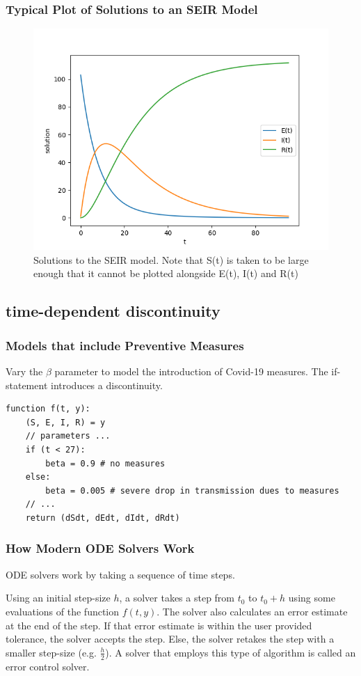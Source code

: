 \documentclass{beamer}
\begin{document}
\begin{frame}
\frametitle{Typical Plot of Solutions to an SEIR Model}
\begin{figure}[H]
\centering
\includegraphics[width=0.7\linewidth]{./figures/SEIR}
\caption{Solutions to the SEIR model. Note that S(t) is taken to be large enough that it cannot be plotted alongside E(t), I(t) and R(t)}
\label{fig:SEIR}
\end{figure}
\end{frame}

\subsection{time-dependent discontinuity}
\begin{frame}[fragile]
\frametitle{Models that include Preventive Measures}
Vary the $\beta$ parameter to model the introduction of Covid-19 measures.
The if-statement introduces a discontinuity.
\begin{lstlisting}
function f(t, y):
    (S, E, I, R) = y
    // parameters ...
    if (t < 27): 
        beta = 0.9 # no measures
    else: 
        beta = 0.005 # severe drop in transmission dues to measures
    // ...
    return (dSdt, dEdt, dIdt, dRdt)
\end{lstlisting}
\end{frame}

\begin{frame}
\frametitle{How Modern ODE Solvers Work}
ODE solvers work by taking a sequence of time steps.

Using an initial step-size $h$, a solver takes a step from $t_0$ to $t_0 + h$ using some evaluations of the function $f(t, y)$. 
\newline \newline
The solver also calculates an error estimate at the end of the step.
If that error estimate is within the user provided tolerance, the solver accepts the step.
Else, the solver retakes the step with a smaller step-size (e.g. $\frac{h}{2}$).
\newline \newline
\newline \newline
A solver that employs this type of algorithm is called an error control solver.
\end{frame}
\end{document}
